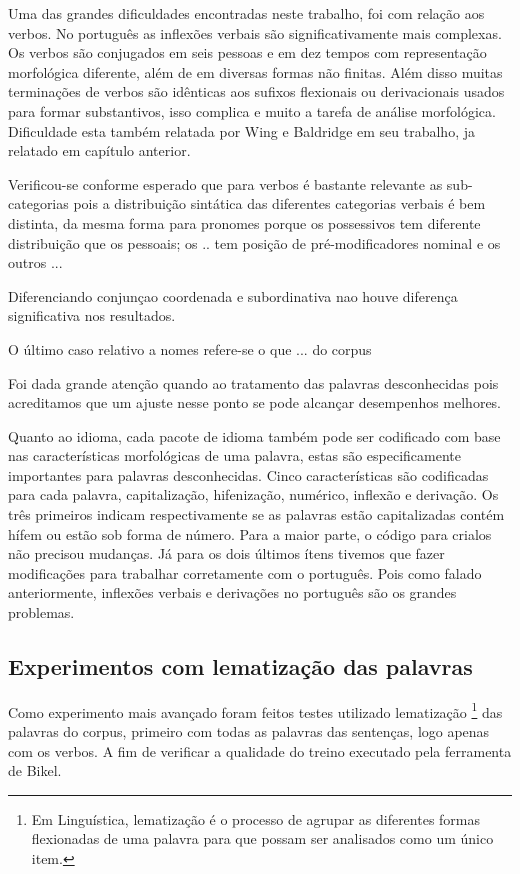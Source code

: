 Uma das grandes dificuldades encontradas neste trabalho, foi com relação aos verbos. No português as inflexões verbais são significativamente mais complexas. Os verbos são conjugados em seis pessoas e em dez tempos com representação morfológica diferente, além de em diversas formas não finitas. Além disso muitas terminações de verbos são idênticas aos sufixos flexionais ou derivacionais usados para formar substantivos, isso complica e muito a tarefa de análise morfológica. Dificuldade esta também relatada por Wing e Baldridge em seu trabalho, ja relatado em capítulo anterior.

Verificou-se conforme esperado que para verbos é bastante relevante as sub-categorias pois a distribuição sintática das diferentes categorias verbais é bem distinta, da mesma forma para pronomes porque os possessivos tem diferente distribuição que os pessoais; os .. tem posição de pré-modificadores nominal e os outros ...

Diferenciando conjunçao coordenada e subordinativa nao houve diferença significativa nos resultados.

O último caso relativo a nomes refere-se  o que ... do corpus 

Foi dada grande atenção quando ao tratamento das palavras desconhecidas pois acreditamos que um ajuste nesse ponto se pode alcançar desempenhos melhores.

Quanto ao idioma, cada pacote de idioma também pode ser codificado com base nas características morfológicas de uma palavra, estas são especificamente importantes para palavras desconhecidas. Cinco características são codificadas para cada palavra, capitalização, hifenização, numérico, inflexão e derivação. Os três primeiros indicam respectivamente se as palavras estão capitalizadas contém hífem ou estão sob forma de número. Para a maior parte, o código para crialos não precisou mudanças. Já para os dois últimos ítens tivemos que fazer modificações para trabalhar corretamente com o português. Pois como falado anteriormente, inflexões verbais e derivações no português são os grandes problemas.


\subsection{Experimentos com lematização das palavras}
\label{sec:lematizacao}

Como experimento mais avançado foram feitos testes utilizado lematização \footnote{Em Linguística, lematização é o processo de agrupar as diferentes formas flexionadas de uma palavra para que possam ser analisados como um único item.} das palavras do corpus, primeiro com todas as palavras das sentenças, logo apenas com os verbos. A fim de verificar a qualidade do treino executado pela ferramenta de Bikel.

